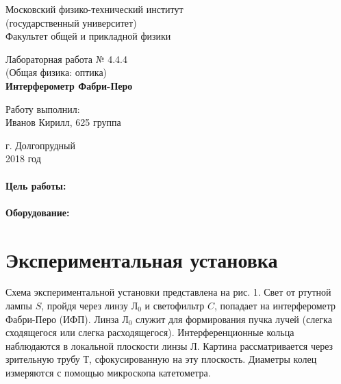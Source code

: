 \documentclass[12pt]{kiarticle} %
\begin{document}
	
	\begin{titlepage}
	\begin{center}
		\large 	Московский физико-технический институт \\
		(государственный университет) \\
		Факультет общей и прикладной физики \\
		\vspace{0.2cm}
		
		\vspace{4.5cm}
		Лабораторная работа № 4.4.4 \\ \vspace{0.2cm}
		\large (Общая физика: оптика) \\ \vspace{0.2cm}
		\LARGE \textbf{Интерферометр Фабри-Перо}
	\end{center}
	\vspace{2.3cm} \large
	
	\begin{center}
		Работу выполнил: \\
		Иванов Кирилл,
		625 группа
		\vspace{10mm}		
		
	\end{center}
	
	\begin{center} \vspace{60mm}
		г. Долгопрудный \\
		2018 год
	\end{center}
\end{titlepage}
	
	\paragraph*{Цель работы:} 
	
	\paragraph*{Оборудование:} 
	
	\section{Экспериментальная установка}
	
	Схема экспериментальной установки представлена на рис. 1. Свет от ртутной лампы $ S $, пройдя через линзу $ Л_0 $ и светофильтр $ C $, попадает на интерферометр Фабри-Перо (ИФП). Линза $ Л_0 $ служит для
	формирования пучка лучей (слегка сходящегося или слегка расходящегося). Интерференционные кольца наблюдаются в локальной плоскости линзы $ Л $. Картина рассматривается через зрительную трубу $ Т $, сфокусированную на эту плоскость. Диаметры колец измеряются с помощью микроскопа катетометра.
	
\end{document}
